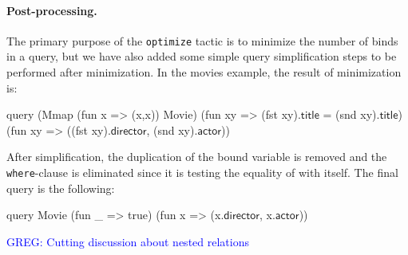 \documentclass[preprint]{sigplanconf}
\newcommand{\greg}[1]{\textcolor{blue}{GREG: #1}}
\newcommand{\ltac}[0]{\ensuremath{\mathcal{L}_{\mathrm{tac}}}}
\begin{document}
\paragraph{Post-processing.}
The primary purpose of the {\tt optimize} tactic is to minimize the number of binds in a query, but we have also added some simple query simplification steps to be performed after minimization.  In the movies example, the result of minimization is:
\begin{coq}
query (Mmap (fun x => (x,x)) Movie)
      (fun xy => (fst xy).$\textsf{title}$ = (snd xy).$\textsf{title}$)
      (fun xy => ((fst xy).$\textsf{director}$, (snd xy).$\textsf{actor}$))
\end{coq}
After simplification, the duplication of the bound variable is removed and the {\tt where}-clause is eliminated since it is testing the equality of  with itself.  The final query is the following:
\begin{coq}
query Movie (fun _ => true) (fun x => (x.$\textsf{director}$, x.$\textsf{actor}$))
\end{coq}

\greg{Cutting discussion about nested relations}

\end{document}
